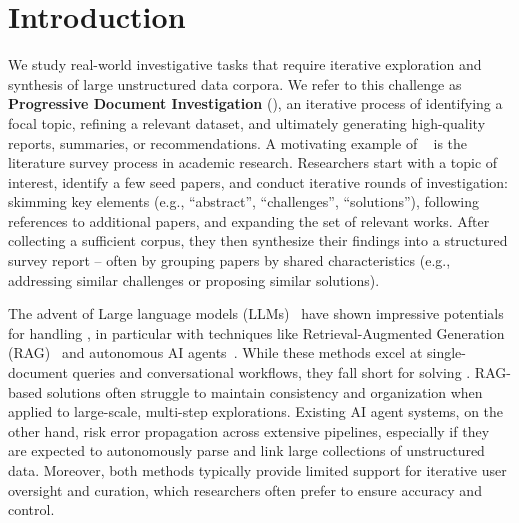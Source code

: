 

\section{Introduction}
\label{sec:intro}

We study real-world investigative tasks that require iterative exploration and synthesis of large unstructured data corpora. We refer to this challenge as \textbf{Progressive Document Investigation} (\problem), an iterative process of identifying a focal topic, refining a relevant dataset, and ultimately generating high-quality reports, summaries, or recommendations.
A motivating example of \problem~ is the literature survey process in academic research. Researchers start with a topic of interest, identify a few seed papers, and conduct iterative rounds of investigation: skimming key elements (e.g., ``abstract'', ``challenges'', ``solutions''), following references to additional papers, and expanding the set of relevant works. After collecting a sufficient corpus, they then synthesize their findings into a structured survey report -- often by grouping papers by shared characteristics (e.g., addressing similar challenges or proposing similar solutions).




The advent of Large language models (LLMs)~\cite{gpt4o} have shown impressive potentials for handling \problem, in particular with techniques like Retrieval-Augmented Generation (RAG)~\cite{lewis2021rag} and autonomous AI agents~\cite{han2024agent}. While these methods excel at single-document queries and conversational workflows, they fall short for solving \problem. %
RAG-based solutions often struggle to maintain consistency and organization when applied to large-scale, multi-step explorations. Existing AI agent systems, on the other hand, risk error propagation across extensive pipelines, especially if they are expected to autonomously parse and link large collections of unstructured data.
Moreover, both methods typically provide limited support for iterative user oversight and curation, which researchers often prefer to ensure accuracy and control.

